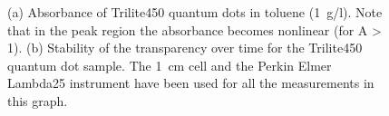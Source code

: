 \documentclass[cits]{JINST}
\begin{document}
\begin{figure}
        \begin{center}
        \caption[]{(a) Absorbance of Trilite450 quantum dots in toluene (1~g/l). Note that in the peak region the absorbance becomes nonlinear (for A > 1). (b) Stability of the transparency over time for the Trilite450 quantum dot sample. The 1~cm cell and the Perkin Elmer Lambda25 instrument have been used for all the measurements in this graph. \label{trilite450_stability}}
        \end{center}
\end{figure}
\end{document}
